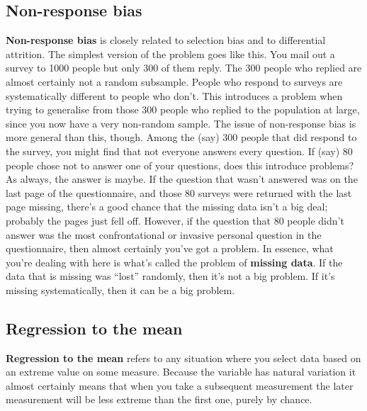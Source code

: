 \documentclass[
  a4paper,
]{book}
\begin{document}
\subsection{Non-response bias}\label{non-response-bias}

\textbf{Non-response bias} is closely related to selection bias and to
differential attrition. The simplest version of the problem goes like
this. You mail out a survey to 1000 people but only 300 of them reply.
The 300 people who replied are almost certainly not a random subsample.
People who respond to surveys are systematically different to people who
don't. This introduces a problem when trying to generalise from those
300 people who replied to the population at large, since you now have a
very non-random sample. The issue of non-response bias is more general
than this, though. Among the (say) 300 people that did respond to the
survey, you might find that not everyone answers every question. If
(say) 80 people chose not to answer one of your questions, does this
introduce problems? As always, the answer is maybe. If the question that
wasn't answered was on the last page of the questionnaire, and those 80
surveys were returned with the last page missing, there's a good chance
that the missing data isn't a big deal; probably the pages just fell
off. However, if the question that 80 people didn't answer was the most
confrontational or invasive personal question in the questionnaire, then
almost certainly you've got a problem. In essence, what you're dealing
with here is what's called the problem of \textbf{missing data}. If the
data that is missing was ``lost'' randomly, then it's not a big problem.
If it's missing systematically, then it can be a big problem.

\subsection{Regression to the mean}\label{regression-to-the-mean}

\textbf{Regression to the mean} refers to any situation where you select
data based on an extreme value on some measure. Because the variable has
natural variation it almost certainly means that when you take a
subsequent measurement the later measurement will be less extreme than
the first one, purely by chance.
\end{document}
